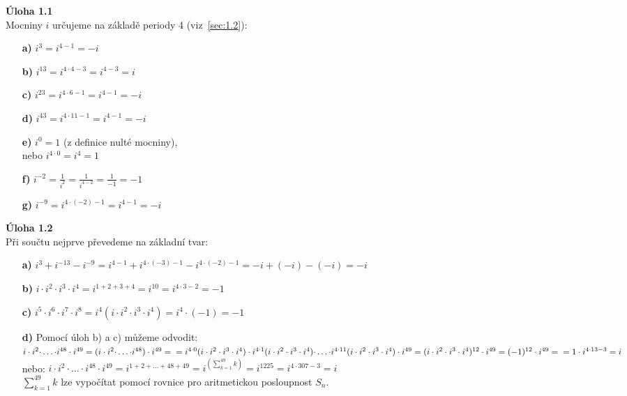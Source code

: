 \documentclass[12pt,a4paper]{report}
\begin{document}
	{\small
		\noindent\textbf{Úloha 1.1}\\
		Mocniny $i$ určujeme na základě periody 4 (viz~\ref{sec:1.2}):
		\begin{multicols}{2}
			\begin{itemize}[leftmargin=*, itemsep=2pt]
				\item[\textbf{a)}] $i^3 = i^{4-1} = -i$
				\item[\textbf{b)}] $i^{13} = i^{4\cdot4-3} = i^{4-3} = i$
				\item[\textbf{c)}] $i^{23} = i^{4\cdot6-1} = i^{4-1} = -i$
				\item[\textbf{d)}] $i^{43} = i^{4\cdot11-1} = i^{4-1} = -i$
				\item[\textbf{e)}] $i^0 = 1$ (z definice nulté mocniny),\\ nebo $i^{4\cdot0} = i^{4} = 1$
				\item[\textbf{f)}] $i^{-2} = \frac{1}{i^2} = \frac{1}{i^{4-2}} = \frac{1}{-1} = -1$
				\item[\textbf{g)}] $i^{-9} = i^{4\cdot(-2)-1} = i^{4-1} = -i$
			\end{itemize}
		\end{multicols}
		
				
				\bigskip
				
				\noindent\textbf{Úloha 1.2}\\
				Při součtu nejprve převedeme na základní tvar:
				\begin{itemize}[leftmargin=*, itemsep=8pt]
					\item[\textbf{a)}] $i^3 + i^{-13} - i^{-9} = i^{4-1} + i^{4\cdot(-3)-1} - i^{4\cdot(-2)-1} = -i + (-i) - (-i) = -i$
					\item[\textbf{b)}] $i \cdot i^2 \cdot i^3 \cdot i^4 = i^{1+2+3+4} = i^{10} = i^{4\cdot3-2} = -1$
					\item[\textbf{c)}] $i^5 \cdot i^6 \cdot i^7 \cdot i^8 = i^{4}(i \cdot i^2 \cdot i^3 \cdot i^4) = i^{4}\cdot(-1) = -1$
					\item[\textbf{d)}] Pomocí úloh b) a c) můžeme odvodit: $i\cdot i^{2} {\cdot} \dots {\cdot} i^{48}\cdot i^{49} = (i\cdot i^{2} {\cdot} \dots {\cdot} i^{48})\cdot i^{49} =\\ = i^{4\cdot0}(i \cdot i^2 \cdot i^3 \cdot i^4)\cdot i^{4\cdot1}(i \cdot i^2 \cdot i^3 \cdot i^4){\cdot}\dots{\cdot}i^{4\cdot11}(i \cdot i^2 \cdot i^3 \cdot i^4)\cdot i^{49} = (i \cdot i^2 \cdot i^3 \cdot i^4)^{12}\cdot i^{49} = (-1)^{12}\cdot i^{49} =\\ = 1\cdot i^{4\cdot13-3} = i$\\
					nebo: $i\cdot i^{2} {\cdot} \dots {\cdot} i^{48}\cdot i^{49} = i^{1+2+\dots+48+49} = i^{\left(\sum\limits_{k=1}^{49} k\right)} = i^{1225} = i^{4\cdot307-3} = i$\\					
					$\sum\limits_{k=1}^{49} k$ lze vypočítat pomocí rovnice pro aritmetickou posloupnost $S_n$.
					
					
				\end{itemize}
	}
	
\end{document}
